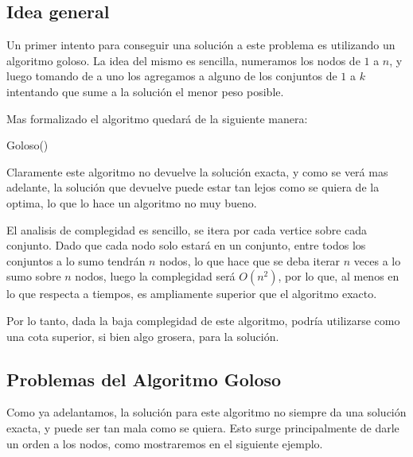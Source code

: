 \subsection{Idea general}

Un primer intento para conseguir una solución a este problema es utilizando un algoritmo goloso. La idea del mismo es sencilla, numeramos los nodos de $1$ a $n$, y luego tomando de a uno los agregamos a alguno de los conjuntos de $1$ a $k$ intentando que sume a la solución el menor peso posible.

Mas formalizado el algoritmo quedará de la siguiente manera:


\begin{algorithm}
  \begin{algorithmic}[1]\parskip=1mm
 \caption{ Goloso()}
  \end{algorithmic}
  \end{algorithm}


Claramente este algoritmo no devuelve la solución exacta, y como se verá mas adelante, la solución que devuelve puede estar tan lejos como se quiera de la optima, lo que lo hace un algoritmo no muy bueno.

El analisis de complegidad es sencillo, se itera por cada vertice sobre cada conjunto. Dado que cada nodo solo estará en un conjunto, entre todos los conjuntos a lo sumo tendrán $n$ nodos, lo que hace que se deba iterar $n$ veces a lo sumo sobre $n$ nodos, luego la complegidad será $O(n^2)$, por lo que, al menos en lo que respecta a tiempos, es ampliamente superior que el algoritmo exacto.

Por lo tanto, dada la baja complegidad de este algoritmo, podría utilizarse como una cota superior, si bien algo grosera, para la solución.

\subsection{Problemas del Algoritmo Goloso}

Como ya adelantamos, la solución para este algoritmo no siempre da una solución exacta, y puede ser tan mala como se quiera. Esto surge principalmente de darle un orden a los nodos, como mostraremos en el siguiente ejemplo.

